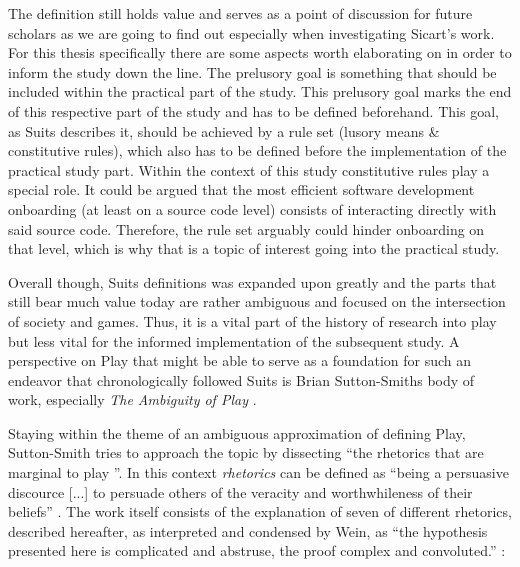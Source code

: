 The definition still holds value and serves as a point of discussion for future scholars as we are going to find out especially when investigating Sicart's work. For this thesis specifically there are some aspects worth elaborating on in order to inform the study down the line. The prelusory goal is something that should be included within the practical part of the study. This prelusory goal marks the end of this respective part of the study and has to be defined beforehand. This goal, as Suits describes it, should be achieved by a rule set (lusory means \& constitutive rules), which also has to be defined before the implementation of the practical study part. Within the context of this study constitutive rules play a special role. It could be argued that the most efficient software development onboarding (at least on a source code level) consists of interacting directly with said source code. Therefore, the rule set arguably could hinder onboarding on that level, which is why that is a topic of interest going into the practical study.

Overall though, Suits definitions was expanded upon greatly and the parts that still bear much value today are rather ambiguous and focused on the intersection of society and games. Thus, it is a vital part of the history of research into play but less vital for the informed implementation of the subsequent study. A perspective on Play that might be able to serve as a foundation for such an endeavor that chronologically followed Suits is Brian Sutton-Smiths body of work, especially \textit{The Ambiguity of Play} \cite{sutton2009ambiguity}.

Staying within the theme of an ambiguous approximation of defining Play, Sutton-Smith tries to approach the topic by dissecting \enquote{the rhetorics that are marginal to play \cite[p. VII]{sutton2009ambiguity}}. In this context \textit{rhetorics} can be defined as \enquote{being a persuasive discource [...] to persuade others of the veracity and worthwhileness of their beliefs} \cite[p. 213]{wein2000suttonreview}. The work itself consists of the explanation of seven of different rhetorics, described hereafter, as interpreted and condensed by Wein, as \enquote{the hypothesis presented here is complicated and abstruse, the proof complex and convoluted.} \cite{wein2000suttonreview}:

